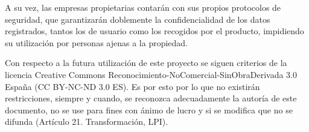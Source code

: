 A su vez, las empresas propietarias contarán con sus propios protocolos de seguridad, que garantizarán doblemente la confidencialidad de los datos registrados, tantos los de usuario como los recogidos por el producto, impidiendo su utilización por personas ajenas a la propiedad.

Con respecto a la futura utilización de este proyecto se siguen criterios de la licencia Creative Commons Reconocimiento-NoComercial-SinObraDerivada 3.0 España (CC BY-NC-ND 3.0 ES). Es por esto por lo que no existirán restricciones, siempre y cuando, se reconozca adecuadamente la autoría de este documento, no se use para fines con ánimo de lucro y si se modifica que no se difunda (Artículo 21. Transformación, LPI).
